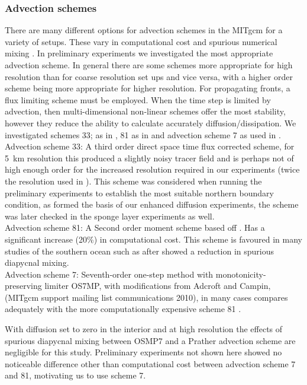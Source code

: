\subsubsection*{Advection schemes}
There are many different options for advection schemes in the MITgcm for a variety of setups. These vary in computational cost and spurious numerical mixing \citep{Ilıcak2012,hill2012}. In preliminary experiments we investigated the most appropriate advection scheme. In general there are some schemes more appropriate for high resolution than for coarse resolution set ups and vice versa, with a higher order scheme being more appropriate for higher resolution. For propagating fronts, a flux limiting scheme must be employed. When the time step is limited by advection, then multi-dimensional non-linear schemes offer the most stability, however they reduce the ability to calculate accurately diffusion/dissipation. We investigated schemes 33; as in \citet{hogg2010}, 81 as in \citet{Abernathey2011} and advection scheme 7 as used in \citet{Zhai2014}.\\
Advection scheme 33: A third order direct space time flux corrected scheme, for 5~km resolution this produced a slightly noisy tracer field and is perhaps not of high enough order for the increased resolution required in our experiments (twice the resolution used in \cite{hogg2010}). This scheme was considered when running the preliminary experiments to establish the most suitable northern boundary condition, as \citet{hogg2010} formed the basis of our enhanced diffusion experiments, the scheme was later checked in the sponge layer experiments as well. \\
Advection scheme 81: A Second order moment scheme based off \cite{Prather}. Has a significant increase (20\%) in computational cost. This scheme is favoured in many studies of the southern ocean such as \citep{Abernathey2011,Abernathey2014,wolfe2014} after \cite{hill2012} showed a reduction in spurious diapycnal mixing.   \\
Advection scheme 7: Seventh-order one-step method with monotonicity-preserving limiter OS7MP, \cite{Daru2004} with modifications from Adcroft and Campin, (MITgcm support mailing list communications 2010), in many cases compares adequately with the more computationally expensive scheme 81 \cite{Ilıcak2012}.

With diffusion set to zero in the interior and at high resolution the effects of spurious diapycnal mixing between OSMP7 and a Prather advection scheme are negligible for this study. Preliminary experiments not shown here showed no noticeable difference other than computational cost between advection scheme 7 and 81, motivating us to use scheme 7.

